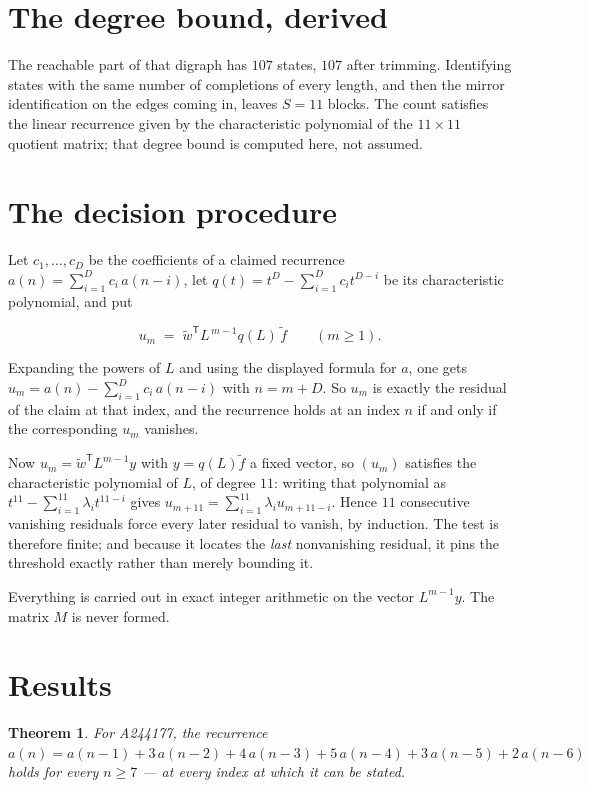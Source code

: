 \documentclass[11pt]{article}
\newtheorem{theorem}{Theorem}
\theoremstyle{definition}
\begin{document}
\section{The degree bound, derived}

The reachable part of that digraph has $107$ states, $107$ after trimming. Identifying states with the same number of completions of every length, and then the mirror identification on the edges coming in, leaves $S = 11$ blocks. The count satisfies the linear recurrence given by the characteristic polynomial of the $11\times11$ quotient matrix; that degree bound is computed here, not assumed.

\section{The decision procedure}

Let $c_1,\dots,c_D$ be the coefficients of a claimed recurrence $a(n) = \sum_{i=1}^{D} c_i\,a(n-i)$, let $q(t) = t^{D} - \sum_{i=1}^{D} c_i t^{D-i}$ be its characteristic polynomial, and put

\[u_m \;=\; \tilde w^{\mathsf T} L^{\,m-1} q(L)\,\tilde f \qquad (m \ge 1).\]

Expanding the powers of $L$ and using the displayed formula for $a$, one gets $u_m = a(n) - \sum_{i=1}^{D} c_i\,a(n-i)$ with $n = m + D$. So $u_m$ is exactly the residual of the claim at that index, and the recurrence holds at an index $n$ if and only if the corresponding $u_m$ vanishes.

Now $u_m = \tilde w^{\mathsf T} L^{m-1} y$ with $y = q(L)\tilde f$ a fixed vector, so $(u_m)$ satisfies the characteristic polynomial of $L$, of degree $11$: writing that polynomial as $t^{11} - \sum_{i=1}^{11} \lambda_i t^{11-i}$ gives $u_{m+11} = \sum_{i=1}^{11} \lambda_i u_{m+11-i}$. Hence $11$ consecutive vanishing residuals force every later residual to vanish, by induction. The test is therefore finite; and because it locates the {\itshape last} nonvanishing residual, it pins the threshold exactly rather than merely bounding it.

Everything is carried out in exact integer arithmetic on the vector $L^{m-1}y$. The matrix $M$ is never formed.

\section{Results}

\begin{theorem} For A244177, the recurrence $a(n) = a(n-1) + 3\,a(n-2) + 4\,a(n-3) + 5\,a(n-4) + 3\,a(n-5) + 2\,a(n-6)$ holds for every $n \ge 7$ --- at every index at which it can be stated.\end{theorem}
\end{document}

